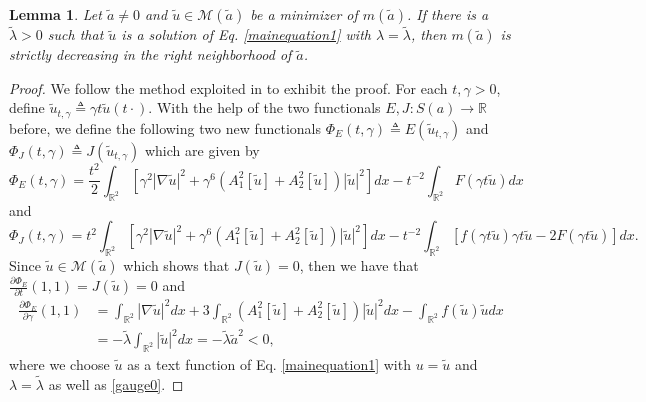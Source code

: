 \documentclass[11pt]{amsart}
\numberwithin{equation}{section}
\newtheorem{lemma}[theorem]{Lemma}
\theoremstyle{definition}
\newcommand{\R}{\mathbb{R}}
\begin{document}
\begin{lemma}\label{decreasing}
Let $\tilde{a}\neq0$ and $\tilde{u}\in \mathcal{M}(\tilde{a})$ be a minimizer of $m(\tilde{a})$.
If there is a $\tilde{\lambda}>0$ such that $\tilde{u}$ is a solution of Eq. \eqref{mainequation1} with $\lambda=\tilde{\lambda}$,
then $m(\tilde{a})$ is strictly decreasing in the right neighborhood of $\tilde{a}$.
\end{lemma}
\begin{proof}
We follow the method exploited in \cite[Proposition 5.1]{GZ}
to exhibit the proof. For each $t,\gamma>0$, define $\tilde{u}_{t,\gamma}\triangleq\gamma t\tilde{u}(t\cdot)$.
With the help of the two functionals $E,J:S(a)\to\R$ before, we define
the following two new functionals
$\Phi_E(t,\gamma)\triangleq E(\tilde{u}_{t,\gamma})$ and $\Phi_J(t,\gamma)\triangleq J(\tilde{u}_{t,\gamma})$
which are given by
\[
\Phi_E(t,\gamma)=\frac{t^2}2\int_{\R^2}[ \gamma^2|\nabla \tilde{u}|^2+
 \gamma^6 (A_1^2[\tilde{u}]+A_2^2[\tilde{u}])|\tilde{u}|^2]dx-
t^{-2}\int_{\R^2}F(\gamma t\tilde{u})dx
\]
and
\[
\Phi_J(t,\gamma)= t^2 \int_{\R^2}[ \gamma^2|\nabla \tilde{u}|^2+
 \gamma^6 (A_1^2[\tilde{u}]+A_2^2[\tilde{u}])|\tilde{u}|^2]dx-
t^{-2}\int_{\R^2}[f(\gamma t\tilde{u})\gamma t\tilde{u}-2F(\gamma t\tilde{u})]dx.
\]
Since $\tilde{u}\in \mathcal{M}(\tilde{a})$ which shows that $J(\tilde{u})=0$, then we have that
$\frac{\partial\Phi_E}{\partial t}(1,1)=J(\tilde{u})=0$ and
\begin{align*}
 \frac{\partial\Phi_E}{\partial \gamma}(1,1)&=\int_{\R^2} |\nabla \tilde{u}|^2dx+3\int_{\R^2}
  (A_1^2[\tilde{u}]+A_2^2[\tilde{u}])|\tilde{u}|^2dx-
 \int_{\R^2}f( \tilde{u})\tilde{u}dx   \\
   & = -\tilde{\lambda}\int_{\R^2}|\tilde{u}|^2dx=-\tilde{\lambda} \tilde{a}^2<0,
\end{align*}
where we choose $\tilde{u}$ as a text function of Eq. \eqref{mainequation1} with
$u=\tilde{u}$ and $\lambda=\tilde{\lambda}$ as well as
  \eqref{gauge0}.


\end{proof}
\end{document}
